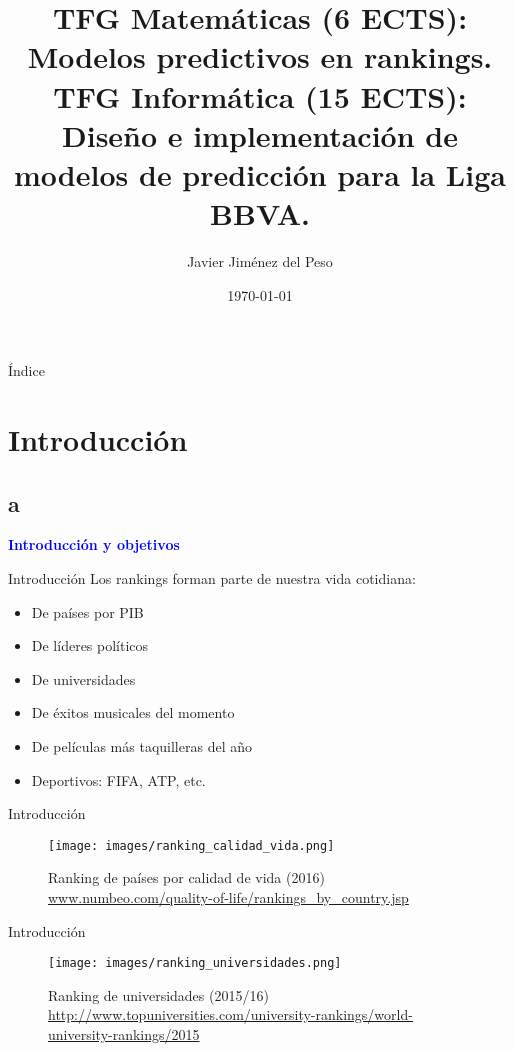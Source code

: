 \documentclass{beamer}
\title{TFG Matemáticas (6 ECTS):\\ Modelos predictivos en rankings.\\ TFG Informática (15 ECTS):\\ Diseño e implementación de modelos de predicción para la Liga BBVA.}
\author{Javier Jiménez del Peso}
\institute[URJC]{\texttt{[image: images/logoURJC.jpg]}}
\date{\today}
\begin{document}
	\begin{frame}
		\titlepage
	\end{frame}

	\begin{frame}{Índice}
		\tableofcontents[hideallsubsections]
	\end{frame}

	\section{Introducción}
	\subsection{a}
	\begin{frame}
		\begin{center}
			\Huge\textbf{\textsf{\textcolor{blue}{Introducción y objetivos}}}
		\end{center}
	\end{frame}
	
	\begin{frame}{Introducción}
		Los rankings forman parte de nuestra vida cotidiana:
		
		\begin{itemize}
			\item De países por PIB			
			\item De líderes políticos
			\item De universidades
			\item De éxitos musicales del momento
			\item De películas más taquilleras del año
			\item Deportivos: FIFA, ATP, etc. 
		\end{itemize}
	\end{frame}	
	
	\begin{frame}{Introducción}
		\begin{figure}
			\centering
			\texttt{[image: images/ranking\_calidad\_vida.png]}
			\caption{Ranking de países por calidad de vida (2016) \url{www.numbeo.com/quality-of-life/rankings_by_country.jsp}}
		\end{figure}
	\end{frame}

	\begin{frame}{Introducción}
		\begin{figure}
			\centering
			\texttt{[image: images/ranking\_universidades.png]}
			\caption{Ranking de universidades (2015/16) \url{http://www.topuniversities.com/university-rankings/world-university-rankings/2015}}
		\end{figure}
	\end{frame}
	
\end{document}
